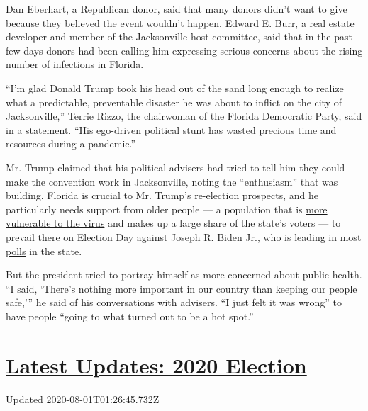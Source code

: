 Dan Eberhart, a Republican donor, said that many donors didn't want to
give because they believed the event wouldn't happen. Edward E. Burr, a
real estate developer and member of the Jacksonville host committee,
said that in the past few days donors had been calling him expressing
serious concerns about the rising number of infections in Florida.

``I'm glad Donald Trump took his head out of the sand long enough to
realize what a predictable, preventable disaster he was about to inflict
on the city of Jacksonville,'' Terrie Rizzo, the chairwoman of the
Florida Democratic Party, said in a statement. ``His ego-driven
political stunt has wasted precious time and resources during a
pandemic.''

Mr. Trump claimed that his political advisers had tried to tell him they
could make the convention work in Jacksonville, noting the
``enthusiasm'' that was building. Florida is crucial to Mr. Trump's
re-election prospects, and he particularly needs support from older
people --- a population that is
\href{https://www.nytimes.com/2020/07/20/us/coronavirus-florida-elderly.html}{more
vulnerable to the virus} and makes up a large share of the state's
voters --- to prevail there on Election Day against
\href{https://www.nytimes.com/interactive/2020/us/elections/joe-biden.html}{Joseph
R. Biden Jr.}, who is
\href{https://www.realclearpolitics.com/epolls/2020/president/fl/florida_trump_vs_biden-6841.html\#polls}{leading
in most polls} in the state.

But the president tried to portray himself as more concerned about
public health. ``I said, `There's nothing more important in our country
than keeping our people safe,''' he said of his conversations with
advisers. ``I just felt it was wrong'' to have people ``going to what
turned out to be a hot spot.''

\hypertarget{latest-updates-2020-election}{%
\section{\texorpdfstring{\href{https://www.nytimes.com/2020/07/31/us/elections/biden-vs-trump.html?action=click\&pgtype=Article\&state=default\&region=MAIN_CONTENT_1\&context=storylines_live_updates}{Latest
Updates: 2020
Election}}{Latest Updates: 2020 Election}}\label{latest-updates-2020-election}}

Updated 2020-08-01T01:26:45.732Z

